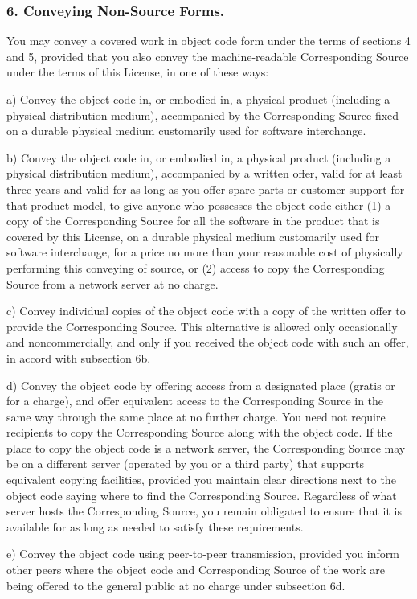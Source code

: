 \subsubsection{6. Conveying Non-Source Forms.}
You may convey a covered work in object code form under the terms of sections 4 and 5, provided that you also convey the machine-readable Corresponding Source under the terms of this License, in one of these ways:\par
a) Convey the object code in, or embodied in, a physical product (including a physical distribution medium), accompanied by the Corresponding Source fixed on a durable physical medium customarily used for software interchange.\par
b) Convey the object code in, or embodied in, a physical product (including a physical distribution medium), accompanied by a written offer, valid for at least three years and valid for as long as you offer spare parts or customer support for that product model, to give anyone who possesses the object code either (1) a copy of the Corresponding Source for all the software in the product that is covered by this License, on a durable physical medium customarily used for software interchange, for a price no more than your reasonable cost of physically performing this conveying of source, or (2) access to copy the Corresponding Source from a network server at no charge.\par
c) Convey individual copies of the object code with a copy of the written offer to provide the Corresponding Source. This alternative is allowed only occasionally and noncommercially, and only if you received the object code with such an offer, in accord with subsection 6b.\par
d) Convey the object code by offering access from a designated place (gratis or for a charge), and offer equivalent access to the Corresponding Source in the same way through the same place at no further charge. You need not require recipients to copy the Corresponding Source along with the object code. If the place to copy the object code is a network server, the Corresponding Source may be on a different server (operated by you or a third party) that supports equivalent copying facilities, provided you maintain clear directions next to the object code saying where to find the Corresponding Source. Regardless of what server hosts the Corresponding Source, you remain obligated to ensure that it is available for as long as needed to satisfy these requirements.\par
e) Convey the object code using peer-to-peer transmission, provided you inform other peers where the object code and Corresponding Source of the work are being offered to the general public at no charge under subsection 6d.\par
